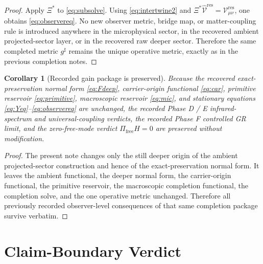 \documentclass[11pt]{article}
\newcommand{\ObserverMap}{\Xi}
\newcommand{\CompletedMetric}{g^{\sharp}}
\newcommand{\ResidualCore}{\mathcal V_{\mu\nu}^{\mathrm{res}}}
\newcommand{\ResidualLift}{\widehat{\mathcal V}^{\mathrm{res}}}
\newtheorem{corollary}{Corollary}
\begin{document}
\begin{proof}
Apply \(\ObserverMap^*\) to \eqref{eq:subsolve}. Using \eqref{eq:intertwine2} and \(\ObserverMap^*\ResidualLift=\ResidualCore\), one obtains \eqref{eq:observereq}. No new observer metric, bridge map, or matter-coupling rule is introduced anywhere in the microphysical sector, in the recovered ambient projected-sector layer, or in the recovered raw deeper sector. Therefore the same completed metric \(\CompletedMetric\) remains the unique operative metric, exactly as in the previous completion notes.
\end{proof}

\begin{corollary}[Recorded gain package is preserved]
\label{cor:gains}
Because the recovered exact-preservation normal form \eqref{eq:Fdeep}, carrier-origin functional \eqref{eq:car}, primitive reservoir \eqref{eq:primitive}, macroscopic reservoir \eqref{eq:mic}, and stationary equations \eqref{eq:Yeq}--\eqref{eq:observereq} are unchanged, the recorded Phase D / E infrared-spectrum and universal-coupling verdicts, the recorded Phase F controlled GR limit, and the zero-free-mode verdict \(\Pi_{\mathrm{free}}H=0\) are preserved without modification.
\end{corollary}

\begin{proof}
The present note changes only the still deeper origin of the ambient projected-sector construction and hence of the exact-preservation normal form. It leaves the ambient functional, the deeper normal form, the carrier-origin functional, the primitive reservoir, the macroscopic completion functional, the completion solve, and the one operative metric unchanged. Therefore all previously recorded observer-level consequences of that same completion package survive verbatim.
\end{proof}

\section{Claim-Boundary Verdict}
\end{document}
